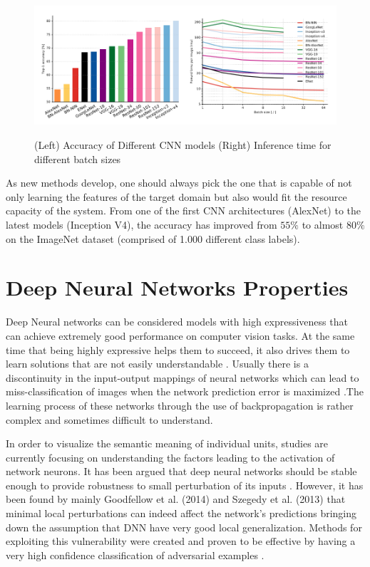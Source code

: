 \begin{figure}[!h]
	\centering
	\includegraphics[scale=0.6]{network_comparison.png}
	\caption{(Left) Accuracy of Different CNN models (Right) Inference time for different batch sizes}
	\cite{canziani2016analysis}
	\label{fig:cnn_comparison}
\end{figure}

As new methods develop, one should always pick the one that is capable of not only learning the features of the target domain but also would fit the resource capacity of the system. From one of the first CNN architectures (AlexNet) to the latest models (Inception V4), the accuracy has improved from $55\%$ to almost $80\%$ on the ImageNet dataset (comprised of 1.000 different class labels).

\section{Deep Neural Networks Properties}\label{subsec: nn_props}

Deep Neural networks can be considered models with high expressiveness that can achieve extremely good performance on computer vision tasks. At the same time that being highly expressive helps them to succeed, it also drives them to learn solutions that are not easily understandable \cite{szegedy2013}. Usually there is a discontinuity in the input-output mappings of neural networks which can lead to miss-classification of images when the network prediction error is maximized \cite{gu2014}.The learning process of these networks through the use of backpropagation is rather complex and sometimes difficult to understand.

In order to visualize the semantic meaning of individual units, studies are currently focusing on understanding the factors leading to the activation of network neurons. It has been argued that deep neural networks should be stable enough to provide robustness to small perturbation of its inputs \cite{szegedy2013}. However, it has been found by mainly Goodfellow et al. (2014) and Szegedy et al. (2013) that minimal local perturbations can indeed affect the network's predictions bringing down the assumption that DNN have very good local generalization. Methods for exploiting this vulnerability were created and proven to be effective by having a very high confidence classification of adversarial examples \cite{goodfellow2016}.

